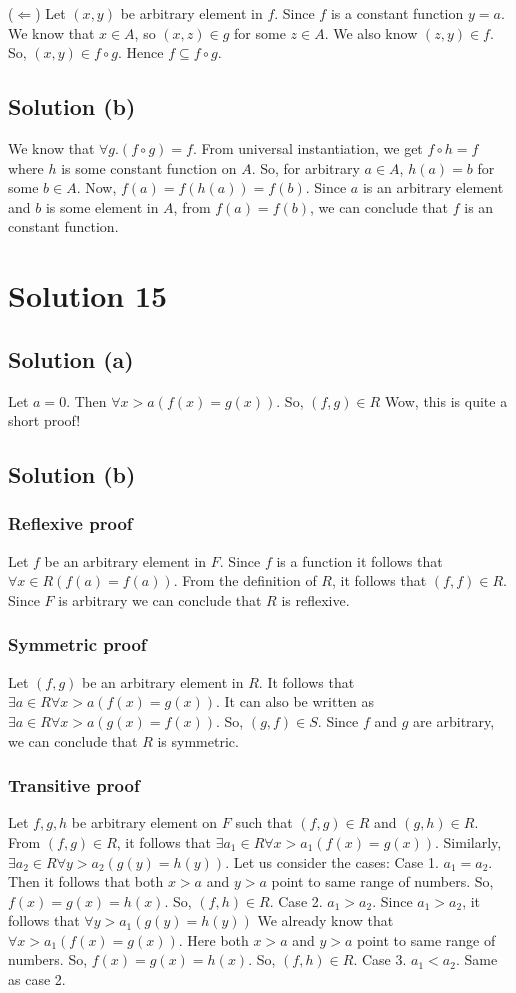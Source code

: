 \documentclass{article}
\begin{document}
($\Leftarrow$) Let $(x,y)$ be arbitrary element in $f$. Since $f$ is a
constant function $y = a$. We know that $x \in A$, so $(x,z) \in g$
for some $z \in A$. We also know $(z,y) \in f$. So, $(x,y) \in f \circ
g$. Hence $f \subseteq f \circ g$.

\subsection{Solution (b)}
We know that $\forall g. (f \circ g) = f$. From universal
instantiation, we get $f \circ h = f$ where $h$ is some constant
function on $A$. So, for arbitrary $a \in A$, $h(a) = b$ for some
$b \in A$. Now, $f(a) = f(h(a)) = f(b)$. Since $a$ is an arbitrary
element and $b$ is some element in $A$, from $f(a) = f(b)$, we can
conclude that $f$ is an constant function.

\section{Solution 15}
\subsection{Solution (a)}
Let $a = 0$. Then $\forall x > a(f(x) = g(x))$. So, $(f,g) \in R$
Wow, this is quite a short proof!

\subsection{Solution (b)}
\subsubsection{Reflexive proof}
Let $f$ be an arbitrary element in $F$. Since $f$ is a function it
follows that $\forall x \in R(f(a) = f(a))$. From the definition of
$R$, it follows that $(f,f) \in R$. Since $F$ is arbitrary we can
conclude that $R$ is reflexive.
\subsubsection{Symmetric proof}
Let $(f,g)$ be an arbitrary element in $R$. It follows that $\exists a
\in R \forall x > a (f(x) = g(x))$. It can also be written as $\exists a
\in R \forall x > a (g(x) = f(x))$. So, $(g,f) \in S$. Since $f$ and
$g$ are arbitrary, we can conclude that $R$ is symmetric.
\subsubsection{Transitive proof}
Let $f,g,h$ be arbitrary element on $F$ such that $(f,g) \in R$ and
$(g,h) \in R$. From $(f,g) \in R$, it follows that $\exists a_1 \in
R \forall x > a_1(f(x) = g(x))$. Similarly, $\exists a_2 \in R \forall y
> a_2 (g(y) = h(y))$. Let us consider the cases:
Case 1. $a_1 = a_2$. Then it follows that  both $x > a$ and $y > a$
point to same range of numbers. So, $f(x) = g(x) = h(x)$. So, $(f,h)
\in R$.
Case 2. $a_1 > a_2$. Since $a_1 > a_2$, it follows that $\forall y >
a_1(g(y) = h(y))$ We already know that $\forall x > a_1(f(x) = g(x))$.
Here both $x > a$ and $y > a$ point to same range of numbers. So,
$f(x) = g(x) = h(x)$. So, $(f,h) \in R$.
Case 3. $a_1 < a_2$. Same as case 2.
\end{document}
